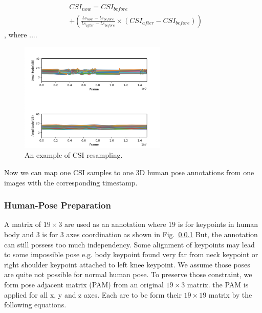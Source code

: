 \documentclass[conference]{IEEEtran}
\begin{document}
	\begin{equation}
		\begin{aligned}
		& CSI_{now} = CSI_{before} \\ 
		& + \left(  \frac{ts_{now}-ts_{before}}{ts_{after}-ts_{before}}  \times (CSI_{after}-CSI_{before})   \right)
		\label{eq:CSIResampling01}
		\end{aligned}
	\end{equation},
		where ....
	
	\begin{figure}[htbp]
		\centerline{\includegraphics[width=70mm,scale=0.5]{CSIResampling01.png}}
		\caption{An example of CSI resampling.}
		\label{fig:CSIResampling01}
	\end{figure}
	
	Now we can map one CSI samples to one 3D human pose annotations from one images with the corresponding timestamp.
	

	\subsubsection{Human-Pose Preparation}
	
	A matrix of $19 \times 3$ are used as an annotation where $19$ is for keypoints in human body and $3$ is for 3 axes coordination as shown in Fig.~\ref{} But, the annotation can still possess too much independency. Some alignment of keypoints may lead to some impossible pose e.g. body keypoint found very far from neck keypoint or right shoulder keypoint attached to left knee keypoint. We assume those poses are quite not possible for normal human pose. To preserve those constraint, we form pose adjacent matrix (PAM) from an original $19\times3$ matrix. the PAM is applied for all x, y and z axes. Each are to be form their $19\times19$ matrix by the following equations.
	
\end{document}
